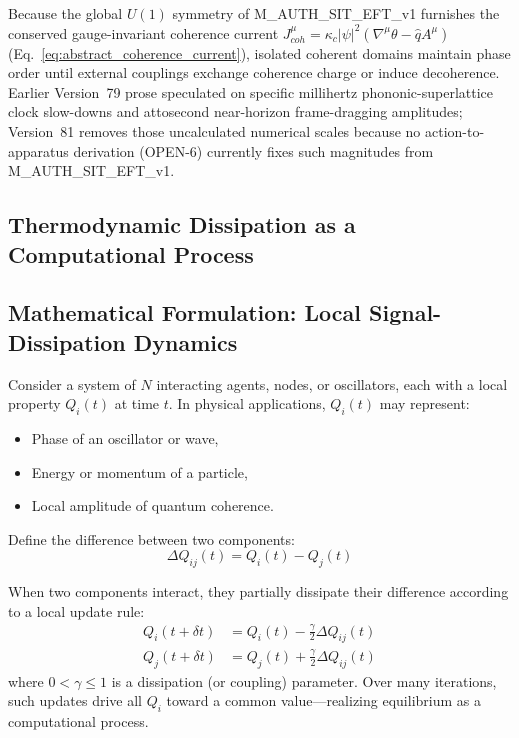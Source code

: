 \documentclass[american,11pt,letterpaper]{article}
\def\mathrm#1{#1}%
\def\texttt#1{#1}%
\begin{document}
Because the global $U(1)$ symmetry of \texttt{M\_AUTH\_SIT\_EFT\_v1} furnishes the conserved gauge-invariant coherence current $J^\mu_{\mathrm{coh}} = \kappa_c |\psi|^2 (\nabla^\mu\theta - \hat{q}A^\mu)$ (Eq.~\eqref{eq:abstract_coherence_current}), isolated coherent domains maintain phase order until external couplings exchange coherence charge or induce decoherence. Earlier Version~79 prose speculated on specific millihertz phononic-superlattice clock slow-downs and attosecond near-horizon frame-dragging amplitudes; Version~81 removes those uncalculated numerical scales because no action-to-apparatus derivation (\texttt{OPEN-6}) currently fixes such magnitudes from \texttt{M\_AUTH\_SIT\_EFT\_v1}.

\subsection{Thermodynamic Dissipation as a Computational Process}

\subsection{Mathematical Formulation: Local Signal-Dissipation Dynamics}

Consider a system of $N$ interacting agents, nodes, or oscillators, each with a local property $Q_i(t)$ at time $t$.
In physical applications, $Q_i(t)$ may represent:

\begin{itemize}
    \item Phase of an oscillator or wave,
    \item Energy or momentum of a particle,
    \item Local amplitude of quantum coherence.
\end{itemize}

Define the difference between two components:
\[
\Delta Q_{ij}(t) = Q_i(t) - Q_j(t)
\]

When two components interact, they partially dissipate their difference according to a local update rule:
\begin{align}
Q_i(t+\delta t) &= Q_i(t) - \frac{\gamma}{2} \Delta Q_{ij}(t) \\
Q_j(t+\delta t) &= Q_j(t) + \frac{\gamma}{2} \Delta Q_{ij}(t)
\label{eq:local-update}
\end{align}
where $0 < \gamma \leq 1$ is a dissipation (or coupling) parameter.
Over many iterations, such updates drive all $Q_i$ toward a common value---realizing equilibrium as a computational process.
\end{document}
